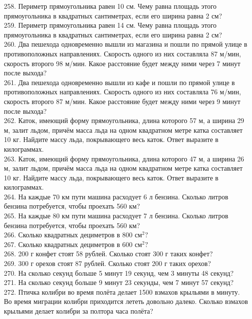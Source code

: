\documentclass[12pt]{article}
\begin{document}
258. Периметр прямоугольника равен 10 см. Чему равна площадь этого прямоугольника в квадратных сантиметрах, если его ширина равна 2 см?\\
259. Периметр прямоугольника равен 14 см. Чему равна площадь этого прямоугольника в квадратных сантиметрах, если его ширина равна 2 см?\\
260. Два пешехода одновременно вышли из магазина и пошли по прямой улице в противоположных направлениях. Скорость одного из них составляла 87 м/мин, скорость второго 98 м/мин. Какое расстояние будет между ними через 7 минут после выхода?\\
261. Два пешехода одновременно вышли из кафе и пошли по прямой улице в противоположных направлениях. Скорость одного из них составляла 76 м/мин, скорость второго 87 м/мин. Какое расстояние будет между ними через 9 минут после выхода?\\
262. Каток, имеющий форму прямоугольника, длина которого 57 м, а ширина 29 м, залит льдом, причём масса льда на одном квадратном метре катка составляет 10 кг. Найдите массу льда, покрывающего весь каток. Ответ выразите в килограммах.\\
263. Каток, имеющий форму прямоугольника, длина которого 47 м, а ширина 26 м, залит льдом, причём масса льда на одном квадратном метре катка составляет 10 кг. Найдите массу льда, покрывающего весь каток. Ответ выразите в килограммах.\\
264. На каждые 70 км пути машина расходует 6 л бензина. Сколько литров бензина потребуется, чтобы проехать 560 км?\\
265. На каждые 80 км пути машина расходует 7 л бензина. Сколько литров бензина потребуется, чтобы проехать 560 км?\\
266. Сколько квадратных дециметров в $800\text{ см}^2?$\\
267. Сколько квадратных дециметров в $600\text{ см}^2?$\\
268. 200 г конфет стоят 58 рублей. Сколько стоят 300 г таких конфет?\\
269. 300 г орехов стоят 87 рублей. Сколько стоят 200 г таких орехов?\\
270. На сколько секунд больше 5 минут 19 секунд, чем 3 минуты 48 секунд?\\
271. На сколько секунд больше 9 минут 23 секунды, чем 7 минут 57 секунд?\\
272. Птичка колибри во время полёта делает 1500 взмахов крыльями в минуту. Во время миграции колибри приходится лететь довольно далеко. Сколько взмахов крыльями делает колибри за полтора часа полёта?\\
\end{document}
